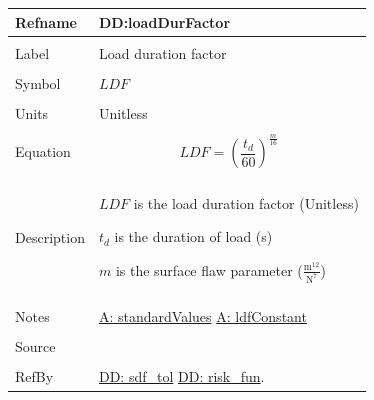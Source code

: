 \documentclass[12pt]{article}
\begin{document}
\noindent \begin{minipage}{\textwidth}
\begin{tabular}{p{} p{}}
\toprule \textbf{Refname} & \textbf{DD:loadDurFactor}
\label{DD:loadDurFactor}
\\ \midrule \\
Label & Load duration factor
        \\ \midrule \\
        Symbol & $LDF$
                 \\ \midrule \\
                 Units & Unitless
                         \\ \midrule \\
                         Equation & \begin{displaymath}
                                    LDF=\left(\frac{{t_{d}}}{60}\right)^{\frac{m}{16}}
                                    \end{displaymath}
                                    \\ \midrule \\
                                    Description & \begin{symbDescription}
                                                  \item{$LDF$ is the load duration factor (Unitless)}
                                                  \item{${t_{d}}$ is the duration of load (s)}
                                                  \item{$m$ is the surface flaw parameter ($\frac{\text{m}^{12}}{\text{N}^{7}}$)}
                                                  \end{symbDescription}
                                                  \\ \midrule \\
                                                  Notes & \hyperref[assumpSV]{A: standardValues}
                                                          \hyperref[assumpLDFC]{A: ldfConstant}
                                                          \\ \midrule \\
                                                          Source & \cite{astm2009}
                                                                   \\ \midrule \\
                                                                   RefBy & \hyperref[DD:sdf.tol]{DD: sdf\_tol} \hyperref[DD:risk.fun]{DD: risk\_fun}.
\\ \bottomrule \end{tabular}
\end{minipage}
\par~
\end{document}
